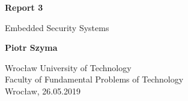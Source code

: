 \begin{titlepage}
  \begin{center}
      \vspace*{1cm}

      \textbf{Report 3}

      \vspace{0.5cm}
       Embedded Security Systems

      \vspace{1.5cm}

      \textbf{Piotr Szyma}

      \vfill

      \vspace{0.8cm}

      Wrocław University of Technology\\
      Faculty of Fundamental Problems of Technology\\
      Wrocław, 26.05.2019

  \end{center}
\end{titlepage}